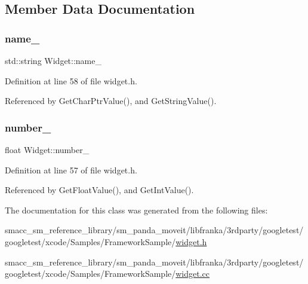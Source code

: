 \subsection{Member Data Documentation}
\mbox{\label{classWidget_a1d2f74810f3f912270a681e0671a7a55}} 
\subsubsection{\texorpdfstring{name\+\_\+}{name\_}}
{\footnotesize\ttfamily std\+::string Widget\+::name\+\_\+\hspace{0.3cm}{\ttfamily [private]}}



Definition at line 58 of file widget.\+h.



Referenced by Get\+Char\+Ptr\+Value(), and Get\+String\+Value().

\mbox{\label{classWidget_a27a2b3fd66372d5731fa9a6bcaab755b}} 
\subsubsection{\texorpdfstring{number\+\_\+}{number\_}}
{\footnotesize\ttfamily float Widget\+::number\+\_\+\hspace{0.3cm}{\ttfamily [private]}}



Definition at line 57 of file widget.\+h.



Referenced by Get\+Float\+Value(), and Get\+Int\+Value().



The documentation for this class was generated from the following files\+:\begin{DoxyCompactItemize}
\item 
smacc\+\_\+sm\+\_\+reference\+\_\+library/sm\+\_\+panda\+\_\+moveit/libfranka/3rdparty/googletest/googletest/xcode/\+Samples/\+Framework\+Sample/\hyperlink{widget_8h}{widget.\+h}\item 
smacc\+\_\+sm\+\_\+reference\+\_\+library/sm\+\_\+panda\+\_\+moveit/libfranka/3rdparty/googletest/googletest/xcode/\+Samples/\+Framework\+Sample/\hyperlink{widget_8cc}{widget.\+cc}\end{DoxyCompactItemize}
